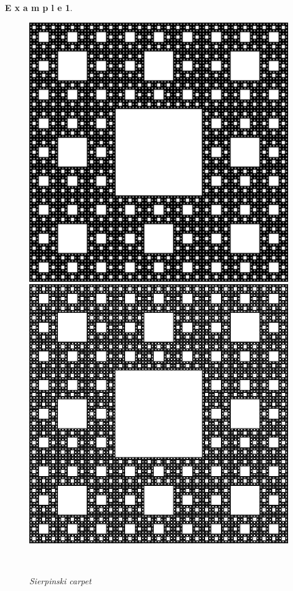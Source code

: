 \documentclass[12pt]{article}
\theoremstyle{plain}
\newtheorem{example}{\textbf{E x a m p l e}}[section]
\begin{document}
\begin{example}
\begin{figure}[H]
\begin{minipage}[c][0.15\width]{
   0.15\textwidth}
\end{minipage}
\begin{minipage}[c][0.15\width]{
   0.15\textwidth}
   \centering
   \includegraphics[width=1\textwidth]{figure/section4/carpet5.png}
\end{minipage}
\begin{minipage}[c][0.15\width]{
   0.15\textwidth}
   \centering
   \includegraphics[width=1\textwidth]{figure/section4/carpet6.png}
\end{minipage}
\\[3ex]\caption{Sierpinski carpet}\label{Sierpinski-carpet}
\end{figure}
\end{example}
\end{document}
